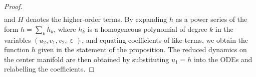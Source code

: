 \documentclass[10pt,a4paper]{amsart}
\DeclareMathOperator{\eps}{\varepsilon}
\begin{document}
\begin{proof}
\begin{equation*}
\begin{split}
  \end{split}
\end{equation*}
%
and $H$ denotes the higher-order terms.
By expanding $h$ as a power series of the form $\displaystyle h = \sum_k h_k$, where $h_k$ is a homogeneous polynomial of degree $k$ in the variables $(u_2,v_1,v_2,\eps)$, and equating coefficients of like terms, we obtain the function $h$ given in the statement of the proposition. 
%
%
The reduced dynamics on the center manifold are then obtained by substituting $u_1 = h$ into the ODEs and relabelling the coefficients.
\end{proof}
\end{document}
